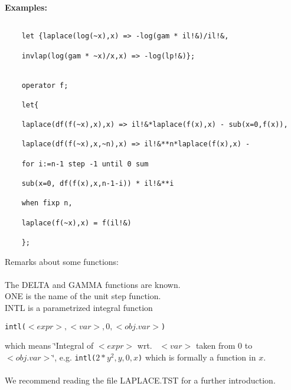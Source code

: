 \pagebreak
{\bf Examples:}
\begin{verbatim}

    let {laplace(log(~x),x) => -log(gam * il!&)/il!&,

    invlap(log(gam * ~x)/x,x) => -log(lp!&)};


    operator f;

    let{

    laplace(df(f(~x),x),x) => il!&*laplace(f(x),x) - sub(x=0,f(x)),

    laplace(df(f(~x),x,~n),x) => il!&**n*laplace(f(x),x) -

    for i:=n-1 step -1 until 0 sum

    sub(x=0, df(f(x),x,n-1-i)) * il!&**i

    when fixp n,

    laplace(f(~x),x) = f(il!&)

    };

\end{verbatim}


Remarks about some functions: \\
\ \\
The DELTA and GAMMA functions are known. \\
ONE is the name of the unit step function. \\
INTL is a parametrized integral function 
\begin{center}
{\tt intl($<expr>,<var>,0,<obj.var>$)}
\end{center}
which means \char`\"{}Integral of $<expr>$ wrt.~ $<var>$ taken from 0 to $<obj.var>$\char`\"{},
e.g. {\tt intl($2{*}y^2,y,0,x$)} which is formally a function in $x$.
\ \\
\ \\
We recommend reading the file LAPLACE.TST for a further introduction.
